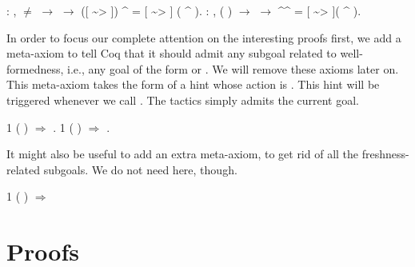 \documentclass[12pt]{report}
\begin{document}
\begin{coqdoccode}
\coqdocemptyline
\coqdocnoindent
{}  : \coqdockw{\ensuremath{\forall}}    ,\coqdoceol
\coqdocindent{1.00em}
 \ensuremath{\not=}  \ensuremath{\rightarrow}   \ensuremath{\rightarrow}\coqdoceol
\coqdocindent{1.00em}
([ \~{}> ]) \^{}  = [ \~{}> ] ( \^{} ).\coqdoceol
\coqdocemptyline
\coqdocnoindent
{}  : \coqdockw{\ensuremath{\forall}}   , \coqdoceol
\coqdocindent{1.00em}
  ( ) \ensuremath{\rightarrow}   \ensuremath{\rightarrow}\coqdoceol
\coqdocindent{1.00em}
 \^{}\^{}  = [ \~{}> ]( \^{} ).\coqdoceol
\coqdocemptyline
\end{coqdoccode}
In order to focus our complete attention on the interesting proofs
    first, we add a meta-axiom to tell Coq that it should admit any
    subgoal related to well-formedness, i.e., any goal of the form
      or  . We will remove these axioms later on.
    This meta-axiom takes the form of a hint whose action is .
    This hint will be triggered whenever we call . The 
    tactics simply admits the current goal. 
\begin{coqdoccode}
\coqdocemptyline
\coqdocnoindent
{} 1 ( \coqdocvar{\_}) \ensuremath{\Rightarrow} .\coqdoceol
\coqdocnoindent
{} 1 ( \coqdocvar{\_}) \ensuremath{\Rightarrow} .\coqdoceol
\coqdocemptyline
\end{coqdoccode}
It might also be useful to add an extra meta-axiom, to get rid of
    all the freshness-related subgoals. We do not need here, though. 


      1 (\coqdocvar{\_}  \coqdocvar{\_}) \ensuremath{\Rightarrow} 

\begin{coqdoccode}
\coqdocemptyline
\end{coqdoccode}
\section{Proofs}
\end{document}
